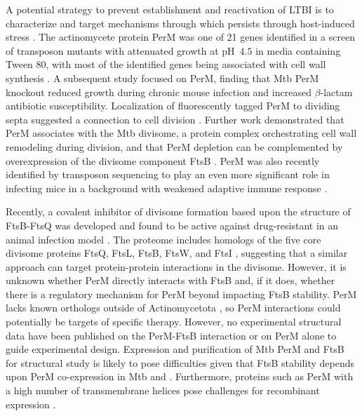\documentclass[pdflatex,sn-basic]{sn-jnl}%
\begin{document}
A potential strategy to prevent establishment and reactivation of LTBI is to characterize and target mechanisms through which \mtb{} persists through host-induced stress \citep{dartoisAntituberculosisTreatmentStrategies2022}. The actinomycete protein PerM was one of 21 genes identified in a screen of transposon \mtb{} mutants with attenuated growth at pH~$4.5$ in media containing Tween 80, with most of the identified genes being associated with cell wall synthesis \citep{vandalMembraneProteinPreserves2008}. A subsequent study focused on PerM, finding that Mtb PerM knockout reduced growth during chronic mouse infection and increased $\beta$-lactam antibiotic susceptibility. Localization of fluorescently tagged PerM to dividing septa suggested a connection to cell division \citep{goodsmithDisruptionTuberculosisMembrane2015}. Further work demonstrated that PerM associates with the Mtb divisome, a protein complex orchestrating cell wall remodeling during division, and that PerM depletion can be complemented by overexpression of the divisome component FtsB \citep{wangPersistentMycobacteriumTuberculosis2019}. PerM was also recently identified by transposon sequencing to play an even more significant role in infecting mice in a background with weakened adaptive immune response \citep{meadeGenomewideScreenIdentifies2023}.

Recently, a covalent inhibitor of divisome formation based upon the structure of FtsB-FtsQ was developed and found to be active against drug-resistant \ec{} in an animal infection model \citep{paulussenCovalentProteomimeticInhibitor2022}. The \mtb{} proteome includes homologs of the five core \ec{} divisome proteins FtsQ, FtsL, FtsB, FtsW, and FtsI \citep{wuCharacterizationConservedNovel2018}, suggesting that a similar approach can target protein-protein interactions in the \mtb{} divisome. However, it is unknown whether PerM directly interacts with FtsB  \citep{wangPersistentMycobacteriumTuberculosis2019} and, if it does, whether there is a regulatory mechanism for PerM beyond impacting FtsB stability. PerM lacks known orthologs outside of Actinomycetota \citep{goodsmithDisruptionTuberculosisMembrane2015}, so PerM interactions could potentially be targets of specific therapy. However, no experimental structural data have been published on the PerM-FtsB interaction or on PerM alone to guide experimental design. Expression and purification of Mtb PerM and FtsB for structural study is likely to pose difficulties given that FtsB stability depends upon PerM co-expression in Mtb and \msmegfull{} \citep{wangPersistentMycobacteriumTuberculosis2019}. Furthermore, proteins such as PerM with a high number of transmembrane helices pose challenges for recombinant expression \citep{graveHighthroughputStrategyIdentification2022, korepanovaCloningExpressionMultiple2005}.
\end{document}
